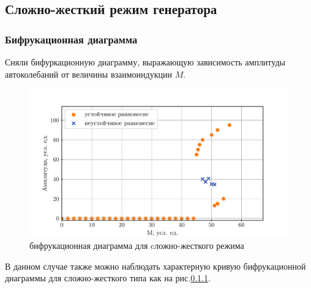 \subsection{Сложно-жесткий режим генератора}
\subsubsection{Бифрукационная диаграмма}
Сняли бифуркационную диаграмму, выражающую зависимость амплитуды автоколебаний от величины взаимоиндукции $M$.
\begin{figure}[h]
	\centering
	\vspace{-10pt}
	\includegraphics[]{plots/veryharddiagram.pdf}
	\caption{бифрукационная диаграмма для cложно-жесткого режима}
	\label{fig12}
\end{figure}
В данном случае также можно наблюдать характерную кривую бифрукационной диаграммы для сложно-жесткого типа как на рис.\ref{}.
